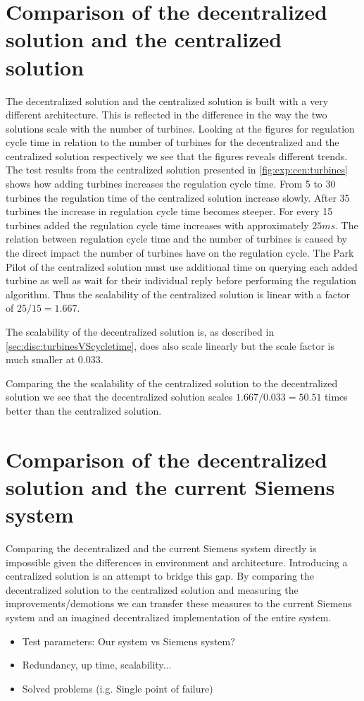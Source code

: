 \section{Comparison of the decentralized solution and the centralized solution}
The decentralized solution and the centralized solution is built with a very different architecture. This is reflected in the difference in the way the two solutions scale with the number of turbines. Looking at the figures for regulation cycle time in relation to the number of turbines for the decentralized and the centralized solution respectively we see that the figures reveals different trends. The test results from the centralized solution presented in \cref{fig:exp:cen:turbines} shows how adding turbines increases the regulation cycle time. From 5 to 30 turbines the regulation time of the centralized solution increase slowly. After 35 turbines the increase in regulation cycle time becomes steeper. For every 15 turbines added the regulation cycle time increases with approximately $25 ms$. The relation between regulation cycle time and the number of turbines is caused by the direct impact the number of turbines have on the regulation cycle. The Park Pilot of the centralized solution must use additional time on querying each added turbine as well as wait for their individual reply before performing the regulation algorithm. Thus the scalability of the centralized solution is linear with a factor of $25 / 15 = 1.667$.

The scalability of the decentralized solution is, as described in \cref{sec:disc:turbinesVScycletime}, does also scale linearly but the scale factor is much smaller at $0.033$.

Comparing the the scalability of the centralized solution to the decentralized solution we see that the decentralized solution scales $1.667 / 0.033 = 50.51$ times better than the centralized solution.

\section{Comparison of the decentralized solution and the current Siemens system}
Comparing the decentralized and the current Siemens system directly is impossible given the differences in environment and architecture. Introducing a centralized solution is an attempt to bridge this gap. By comparing the decentralized solution to the centralized solution and measuring the improvements/demotions we can transfer these measures to the current Siemens system and an imagined decentralized implementation of the entire system. 

\begin{itemize}
	\item Test parameters: Our system vs Siemens system?
	\item Redundancy, up time, scalability...
	\item Solved problems (i.g. Single point of failure)
\end{itemize}